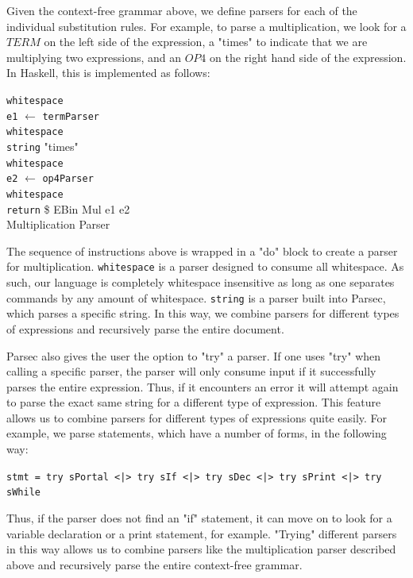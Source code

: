 \documentclass[numbers]{sigplanconf}
\begin{document}
Given the context-free grammar above, we define parsers for each of the individual substitution rules. For example, to parse a multiplication, we look for a $TERM$ on the left side of the expression, a "times" to indicate that we are multiplying two expressions, and an $OP4$ on the right hand side of the expression. In Haskell, this is implemented as follows:

\begin{algorithm}
	\texttt{whitespace} \\
	\texttt{e1} $\leftarrow$ \texttt{termParser}\\
	\texttt{whitespace} \\
	\texttt{string} "times" \\
	\texttt{whitespace} \\
	\texttt{e2} $\leftarrow$ \texttt{op4Parser} \\
	\texttt{whitespace} \\
	\texttt{return} \$ EBin Mul e1 e2  \\
	\caption{Multiplication Parser}
\end{algorithm}

The sequence of instructions above is wrapped in a "do" block to create a parser for multiplication. \texttt{whitespace} is a parser designed to consume all whitespace. As such, our language is completely whitespace insensitive as long as one separates commands by any amount of whitespace. \texttt{string} is a parser built into Parsec, which parses a specific string. In this way, we combine parsers for different types of expressions and recursively parse the entire document. 

Parsec also gives the user the option to "try" a parser. If one uses "try" when calling a specific parser, the parser will only consume input if it successfully parses the entire expression. Thus, if it encounters an error it will attempt again to parse the exact same string for a different type of expression. This feature allows us to combine parsers for different types of expressions quite easily. For example, we parse statements, which have a number of forms, in the following way:

\texttt{stmt = try sPortal <|> try sIf <|> try sDec <|> try sPrint <|> try sWhile}

Thus, if the parser does not find an "if" statement, it can move on to look for a variable declaration or a print statement, for example. "Trying" different parsers in this way allows us to combine parsers like the multiplication parser described above and recursively parse the entire context-free grammar. 
\end{document}
